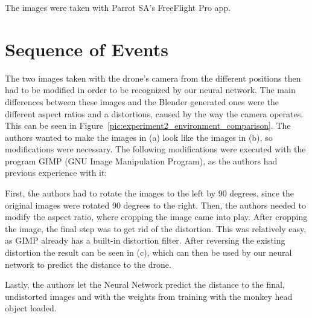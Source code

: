 The images were taken with Parrot SA's FreeFlight Pro app.

\section{Sequence of Events}
The two images taken with the drone's camera from the different positions then had to be modified in order to be recognized by our neural network. The main differences between these images and the Blender generated ones were the different aspect ratios and a distortions, caused by the way the camera operates. This can be seen in Figure~\ref{pic:experiment2_environment_comparison}. The authors wanted to make the images in (a) look like the images in (b), so modifications were necessary. The following modifications were executed with the program GIMP (GNU Image Manipulation Program), as the authors had previous experience with it:

First, the authors had to rotate the images to the left by 90 degrees, since the original images were rotated 90 degrees to the right. Then, the authors needed to modify the aspect ratio, where cropping the image came into play. After cropping the image, the final step was to get rid of the distortion. This was relatively easy, as GIMP already has a built-in distortion filter. After reversing the existing distortion the result can be seen in (c), which can then be used by our neural network to predict the distance to the drone.

Lastly, the authors let the Neural Network predict the distance to the final, undistorted images and with the weights from training with the monkey head object loaded.

